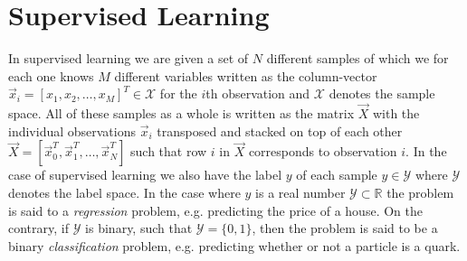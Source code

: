 \section{Supervised Learning}
\label{sec:ml:supervised_learning}
In supervised learning we are given a set of $N$ different samples of which we for each one knows $M$ different variables written as the column-vector $\vec{x}_i = [x_1, x_2, \dots, x_M]^T \in \mathcal{X}$ for the $i$th observation and $\mathcal{X}$ denotes the sample space. All of these samples as a whole is written as the matrix $\vec{X}$ with the individual observations $\vec{x}_i$ transposed and stacked on top of each other $\vec{X} = [\vec{x}_0^T, \vec{x}_1^T, \dots, \vec{x}_N^T]$ such that row $i$ in $\vec{X}$ corresponds to observation $i$. In the case of supervised learning we also have the label $y$ of each sample $y \in \mathcal{Y}$ where $\mathcal{Y}$ denotes the label space. 
In the case where $y$ is a real number $\mathcal{Y} \subset \mathbb{R}$ the problem is said to a \emph{regression} problem, e.g. predicting the price of a house. On the contrary, if $\mathcal{Y}$ is binary, such that $\mathcal{Y} = \{0, 1\}$, then the problem is said to be a binary \emph{classification} problem, e.g. predicting whether or not a particle is a quark. 

